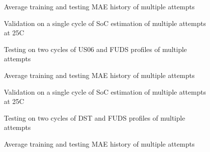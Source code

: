 \begin{figure*}[htbp]
    \centering
    \begin{subfigure}[b]{0.325\textwidth}
        \centering
        
        \caption{Average training and testing MAE history of multiple attempts}
    \end{subfigure}
    \hfill
    \begin{subfigure}[b]{0.325\textwidth}
        \centering
        
        \caption{Validation on a single cycle of SoC estimation of multiple attempts at 25\textdegree{}C}
    \end{subfigure}
    \hfill
    \begin{subfigure}[b]{0.325\textwidth}
        \centering
        
        \caption{Testing on two cycles of US06 and FUDS profiles of multiple attempts}
        \label{subfig:Model-3res-DSTvsFUDS}
    \end{subfigure}
    \begin{subfigure}[b]{0.325\textwidth}
        \centering
        
        \caption{Average training and testing MAE history of multiple attempts}
    \end{subfigure}
    \hfill
    \begin{subfigure}[b]{0.325\textwidth}
        \centering
        
        \caption{Validation on a single cycle of SoC estimation of multiple attempts at 25\textdegree{}C}
    \end{subfigure}
    \hfill
    \begin{subfigure}[b]{0.325\textwidth}
        \centering
        
        \caption{Testing on two cycles of DST and FUDS profiles of multiple attempts}
    \end{subfigure}
    \begin{subfigure}[b]{0.325\textwidth}
        \centering
        
        \caption{Average training and testing MAE history of multiple attempts}

\end{subfigure}
\end{figure*}
